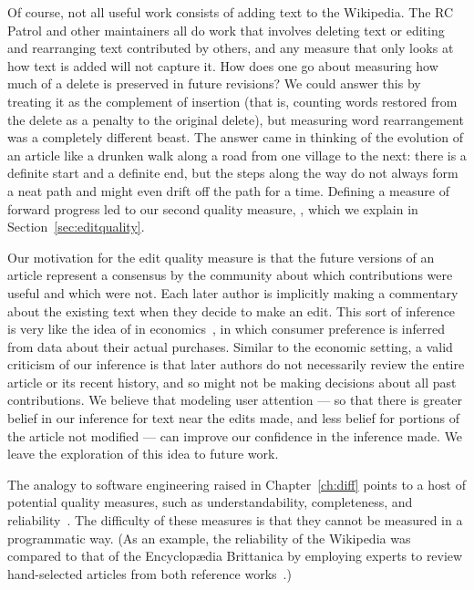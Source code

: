 Of course, not all useful work consists of adding text to the Wikipedia.
The RC Patrol and other maintainers all do work that involves
deleting text or editing and rearranging text contributed by others,
and any measure that only looks at how text is added will not capture it.
How does one go about measuring how much of a delete is preserved
in future revisions?
We could answer this by treating it as the complement of insertion
(that is, counting words restored from the delete as a
penalty to the original delete), but measuring word rearrangement
was a completely different beast.
The answer came in thinking of the evolution of an article
like a drunken walk along a road from one village to the next:
there is a definite start and a definite end, but the steps along the way
do not always form a neat path and might even drift off the path for a time.
Defining a measure of forward progress led to our second
quality measure, , which we explain in
Section~\ref{sec:editquality}.

Our motivation for the edit quality measure is that the future
versions of an article represent a consensus by the community about
which contributions were useful and which were not.
Each later author is implicitly making a commentary about the
existing text when they decide to make an edit.
This sort of inference is very like the idea of
 in economics~\cite{Samuelson1938,Varian2006},
in which consumer preference is inferred from data about their
actual purchases.
Similar to the economic setting, a valid criticism of our inference
is that later authors do not necessarily review the entire article
or its recent history, and so might not be making decisions about
all past contributions.
We believe that modeling user attention --- so that there is greater
belief in our inference for text near the edits made, and less belief
for portions of the article not modified ---
can improve our confidence in the inference made.
We leave the exploration of this idea to future work.

The analogy to software engineering raised in Chapter~\ref{ch:diff}
points to a host of potential quality measures, such as
understandability, completeness, and reliability~\cite{wiki:SoftwareQuality}.
The difficulty of these measures is that they cannot be measured
in a programmatic way.
(As an example, the reliability of the Wikipedia was compared to that
of the Encyclop{\ae}dia Brittanica by employing experts to review
hand-selected articles from both reference works~\cite{Giles2005}.)

